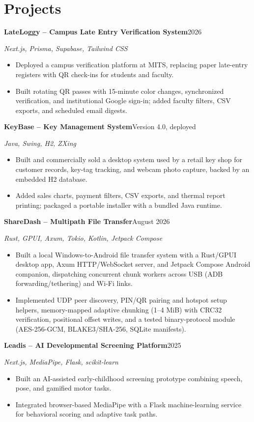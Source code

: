 \documentclass[a4paper,10pt]{article}
\newcommand{\project}[3]{%
  \noindent\textbf{#1}\hfill{\small #2}\par
  {\small\emph{#3}}\par\vspace{-2pt}%
}
\begin{document}
\section{Projects}
\project{LateLoggy -- Campus Late Entry Verification System}{2026}{Next.js, Prisma, Supabase, Tailwind CSS}
\begin{itemize}
  \item Deployed a campus verification platform at MITS, replacing paper late-entry registers with QR check-ins for students and faculty.
  \item Built rotating QR passes with 15-minute color changes, synchronized verification, and institutional Google sign-in; added faculty filters, CSV exports, and scheduled email digests.
\end{itemize}

\project{KeyBase -- Key Management System}{Version 4.0, deployed}{Java, Swing, H2, ZXing}
\begin{itemize}
  \item Built and commercially sold a desktop system used by a retail key shop for customer records, key-tag tracking, and webcam photo capture, backed by an embedded H2 database.
  \item Added sales charts, payment filters, CSV exports, and thermal report printing; packaged a portable installer with a bundled Java runtime.
\end{itemize}

\project{ShareDash -- Multipath File Transfer}{August 2026}{Rust, GPUI, Axum, Tokio, Kotlin, Jetpack Compose}
\begin{itemize}
  \item Built a local Windows-to-Android file transfer system with a Rust/GPUI desktop app, Axum HTTP/WebSocket server, and Jetpack Compose Android companion, dispatching concurrent chunk workers across USB (ADB forwarding/tethering) and Wi-Fi links.
  \item Implemented UDP peer discovery, PIN/QR pairing and hotspot setup helpers, memory-mapped adaptive chunking (1--4 MiB) with CRC32 verification, positional offset writes, and a tested binary-protocol module (AES-256-GCM, BLAKE3/SHA-256, SQLite manifests).
\end{itemize}

\project{Leadis -- AI Developmental Screening Platform}{2025}{Next.js, MediaPipe, Flask, scikit-learn}
\begin{itemize}
  \item Built an AI-assisted early-childhood screening prototype combining speech, pose, and gamified motor tasks.
  \item Integrated browser-based MediaPipe with a Flask machine-learning service for behavioral scoring and adaptive task paths.
\end{itemize}
\end{document}
